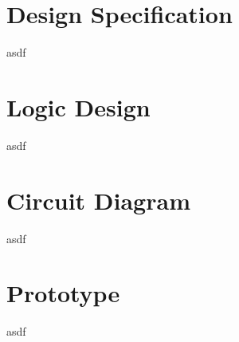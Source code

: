 \section{Design Specification}
asdf

\section{Logic Design}
asdf

\section{Circuit Diagram}
asdf

\section{Prototype}
asdf
